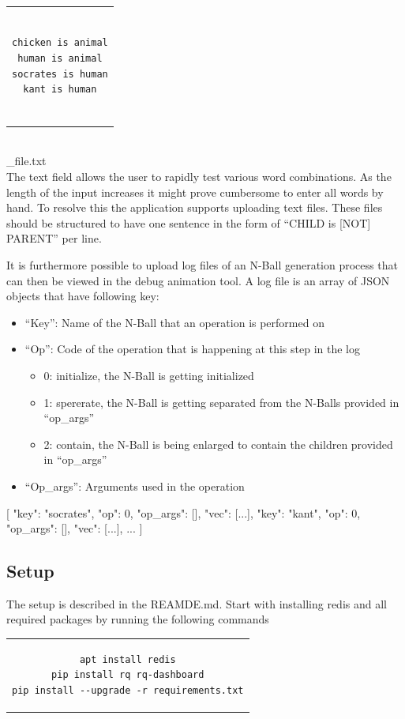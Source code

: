 \documentclass[]{article}
\begin{document}
\begin{center}
\begin{tabular}{c}
\begin{lstlisting}

chicken is animal
human is animal
socrates is human
kant is human


\end{lstlisting}
\end{tabular}
\\_file.txt
\\The text field allows the user to rapidly test various word combinations. As the length of the input increases it might prove cumbersome to enter all words by hand. To resolve this the application supports uploading text files. These files should be structured to have one sentence in the form of “CHILD is [NOT] PARENT” per line.
\end{center}

It is furthermore possible to upload log files of an N-Ball generation process that can then be viewed in the debug animation tool. A log file is an array of JSON objects that have following key:
\begin{itemize}
\item “Key”: Name of the N-Ball that an operation is performed on
\item “Op”: Code of the operation that is happening at this step in the log
\begin{itemize}
\item 0: initialize, the N-Ball is getting initialized 
\item 1: spererate, the N-Ball is getting separated from the N-Balls provided in “op\_args”
\item 2: contain, the N-Ball is being enlarged to contain the children provided in “op\_args”
\end{itemize}
\item “Op\_args”: Arguments used in the operation
\end{itemize}
[ {"key": "socrates", "op": 0, "op\_args": [], "vec": [...]}, 
{"key": "kant", "op": 0, "op\_args": [], "vec": [...]}, ... ]	


\subsection{Setup}
The setup is described in the REAMDE.md.
Start with installing redis and all required packages by running the following commands

\begin{center}
\begin{tabular}{c}
\begin{lstlisting}
apt install redis
pip install rq rq-dashboard
pip install --upgrade -r requirements.txt
\end{lstlisting}
\end{tabular}
\end{center}
\end{document}
